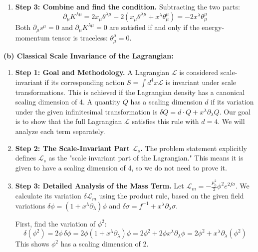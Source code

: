 \begin{solution}
\begin{enumerate}
    \item \textbf{Step 3: Combine and find the condition.}
    Subtracting the two parts:
    \[ \partial_\mu K^{\lambda\mu} = 2x_\mu \theta^{\lambda\mu} - 2(x_\mu \theta^{\lambda\mu} + x^\lambda \theta^\mu_\mu) = -2x^\lambda \theta^\mu_\mu \]
    Both $\partial_\mu s^\mu = 0$ and $\partial_\mu K^{\lambda\mu} = 0$ are satisfied if and only if the energy-momentum tensor is traceless: $\theta^\mu_\mu = 0$.
\end{enumerate}

\textbf{(b) Classical Scale Invariance of the Lagrangian:}
\begin{enumerate}
    \item \textbf{Step 1: Goal and Methodology.}
    A Lagrangian $\mathcal{L}$ is considered scale-invariant if its corresponding action $S = \int d^4x \mathcal{L}$ is invariant under scale transformations. This is achieved if the Lagrangian density has a canonical scaling dimension of 4. A quantity $Q$ has a scaling dimension $d$ if its variation under the given infinitesimal transformation is $\delta Q = d \cdot Q + x^\lambda \partial_\lambda Q$. Our goal is to show that the full Lagrangian $\mathcal{L}$ satisfies this rule with $d=4$. We will analyze each term separately.

    \item \textbf{Step 2: The Scale-Invariant Part $\mathcal{L}_s$.}
    The problem statement explicitly defines $\mathcal{L}_s$ as the "scale invariant part of the Lagrangian." This means it is given to have a scaling dimension of 4, so we do not need to prove it.
    
    \item \textbf{Step 3: Detailed Analysis of the Mass Term.}
    Let $\mathcal{L}_m = - \frac{\mu_0^2}{2} \phi^2 e^{2f\sigma}$. We calculate its variation $\delta \mathcal{L}_m$ using the product rule, based on the given field variations $\delta\phi = (1+x^\lambda\partial_\lambda)\phi$ and $\delta\sigma = f^{-1} + x^\lambda\partial_\lambda\sigma$.

    First, find the variation of $\phi^2$:
    \[ \delta(\phi^2) = 2\phi\,\delta\phi = 2\phi(1 + x^\lambda\partial_\lambda)\phi = 2\phi^2 + 2\phi x^\lambda\partial_\lambda\phi = 2\phi^2 + x^\lambda\partial_\lambda(\phi^2) \]
    This shows $\phi^2$ has a scaling dimension of 2.


\end{enumerate}
\end{solution}

